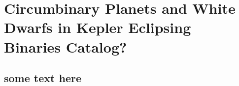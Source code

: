 \chapter{Circumbinary Planets and White Dwarfs in Kepler Eclipsing Binaries Catalog?}
\section{some text here}